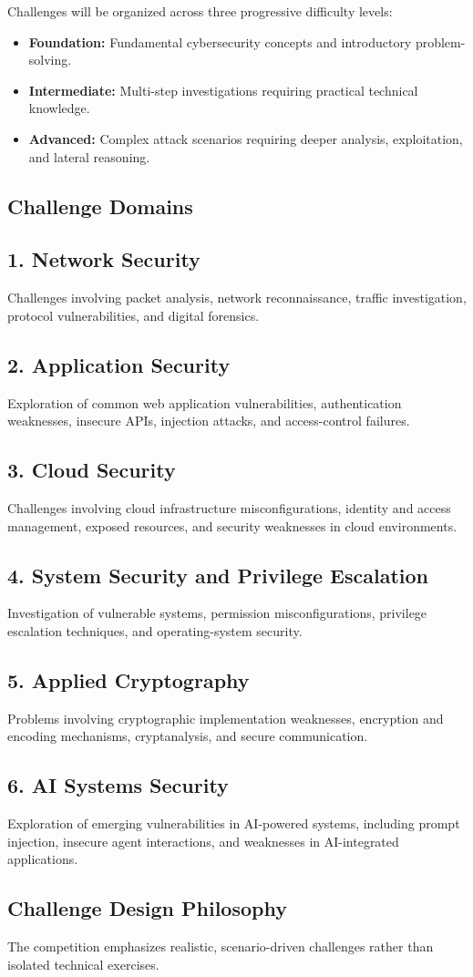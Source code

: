 \documentclass[11pt,a4paper]{article}
\newcommand{\domain}[2]{%
    \subsection*{#1}
    #2
}
\begin{document}
Challenges will be organized across three progressive difficulty levels:
\begin{itemize}
    \item \textbf{Foundation:} Fundamental cybersecurity concepts and introductory
    problem-solving.
    \item \textbf{Intermediate:} Multi-step investigations requiring practical technical
    knowledge.
    \item \textbf{Advanced:} Complex attack scenarios requiring deeper analysis,
    exploitation, and lateral reasoning.
\end{itemize}

\subsection*{Challenge Domains}

\domain{1. Network Security}{
Challenges involving packet analysis, network reconnaissance, traffic investigation,
protocol vulnerabilities, and digital forensics.
}

\domain{2. Application Security}{
Exploration of common web application vulnerabilities, authentication weaknesses,
insecure APIs, injection attacks, and access-control failures.
}

\domain{3. Cloud Security}{
Challenges involving cloud infrastructure misconfigurations, identity and access
management, exposed resources, and security weaknesses in cloud environments.
}

\domain{4. System Security and Privilege Escalation}{
Investigation of vulnerable systems, permission misconfigurations, privilege escalation
techniques, and operating-system security.
}

\domain{5. Applied Cryptography}{
Problems involving cryptographic implementation weaknesses, encryption and encoding
mechanisms, cryptanalysis, and secure communication.
}

\domain{6. AI Systems Security}{
Exploration of emerging vulnerabilities in AI-powered systems, including prompt
injection, insecure agent interactions, and weaknesses in AI-integrated applications.
}

\subsection*{Challenge Design Philosophy}

The competition emphasizes realistic, scenario-driven challenges rather than isolated
technical exercises.
\end{document}
